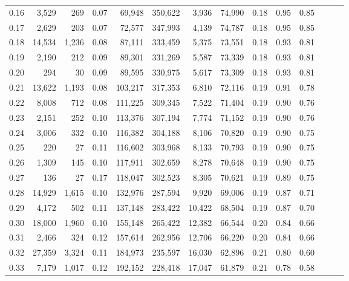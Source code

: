 \begin{tabular}{rrrrrrrrrrrrrr}
0.16 &   3,529 &    269 &  0.07 &   69,948 &  350,622 &   3,936 &  74,990 &  0.18 &  0.95 &      0.85 \\
0.17 &   2,629 &    203 &  0.07 &   72,577 &  347,993 &   4,139 &  74,787 &  0.18 &  0.95 &      0.85 \\
0.18 &  14,534 &  1,236 &  0.08 &   87,111 &  333,459 &   5,375 &  73,551 &  0.18 &  0.93 &      0.81 \\
0.19 &   2,190 &    212 &  0.09 &   89,301 &  331,269 &   5,587 &  73,339 &  0.18 &  0.93 &      0.81 \\
0.20 &     294 &     30 &  0.09 &   89,595 &  330,975 &   5,617 &  73,309 &  0.18 &  0.93 &      0.81 \\
0.21 &  13,622 &  1,193 &  0.08 &  103,217 &  317,353 &   6,810 &  72,116 &  0.19 &  0.91 &      0.78 \\
0.22 &   8,008 &    712 &  0.08 &  111,225 &  309,345 &   7,522 &  71,404 &  0.19 &  0.90 &      0.76 \\
0.23 &   2,151 &    252 &  0.10 &  113,376 &  307,194 &   7,774 &  71,152 &  0.19 &  0.90 &      0.76 \\
0.24 &   3,006 &    332 &  0.10 &  116,382 &  304,188 &   8,106 &  70,820 &  0.19 &  0.90 &      0.75 \\
0.25 &     220 &     27 &  0.11 &  116,602 &  303,968 &   8,133 &  70,793 &  0.19 &  0.90 &      0.75 \\
0.26 &   1,309 &    145 &  0.10 &  117,911 &  302,659 &   8,278 &  70,648 &  0.19 &  0.90 &      0.75 \\
0.27 &     136 &     27 &  0.17 &  118,047 &  302,523 &   8,305 &  70,621 &  0.19 &  0.89 &      0.75 \\
0.28 &  14,929 &  1,615 &  0.10 &  132,976 &  287,594 &   9,920 &  69,006 &  0.19 &  0.87 &      0.71 \\
0.29 &   4,172 &    502 &  0.11 &  137,148 &  283,422 &  10,422 &  68,504 &  0.19 &  0.87 &      0.70 \\
0.30 &  18,000 &  1,960 &  0.10 &  155,148 &  265,422 &  12,382 &  66,544 &  0.20 &  0.84 &      0.66 \\
0.31 &   2,466 &    324 &  0.12 &  157,614 &  262,956 &  12,706 &  66,220 &  0.20 &  0.84 &      0.66 \\
0.32 &  27,359 &  3,324 &  0.11 &  184,973 &  235,597 &  16,030 &  62,896 &  0.21 &  0.80 &      0.60 \\
0.33 &   7,179 &  1,017 &  0.12 &  192,152 &  228,418 &  17,047 &  61,879 &  0.21 &  0.78 &      0.58 \\

\end{tabular}
